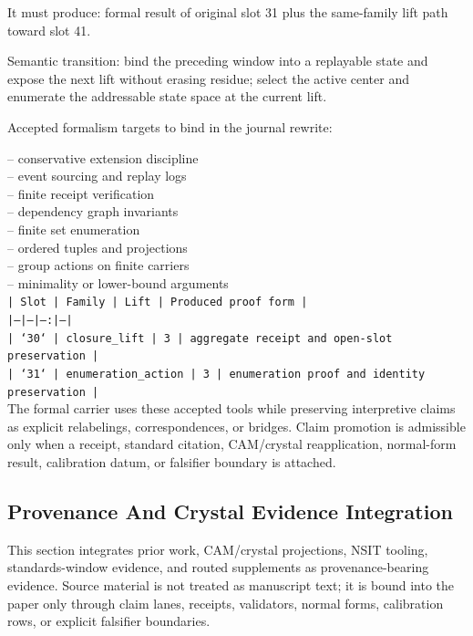 \documentclass[11pt]{article}
\begin{document}
It must produce: formal result of original slot 31 plus the same-family lift path toward slot 41.

Semantic transition: bind the preceding window into a replayable state and expose the next lift without erasing residue; select the active center and enumerate the addressable state space at the current lift.

Accepted formalism targets to bind in the journal rewrite:

\noindent{}-- conservative extension discipline\\
\noindent{}-- event sourcing and replay logs\\
\noindent{}-- finite receipt verification\\
\noindent{}-- dependency graph invariants\\
\noindent{}-- finite set enumeration\\
\noindent{}-- ordered tuples and projections\\
\noindent{}-- group actions on finite carriers\\
\noindent{}-- minimality or lower-bound arguments\\

\noindent\texttt{| Slot | Family | Lift | Produced proof form |}\\
\noindent\texttt{|---|---|---:|---|}\\
\noindent\texttt{| `30` | closure\_lift | 3 | aggregate receipt and open-slot preservation |}\\
\noindent\texttt{| `31` | enumeration\_action | 3 | enumeration proof and identity preservation |}\\

The formal carrier uses these accepted tools while preserving interpretive
claims as explicit relabelings, correspondences, or bridges. Claim promotion is admissible only when a receipt, standard citation,
CAM/crystal reapplication, normal-form result, calibration datum, or falsifier
boundary is attached.

\subsection*{Provenance And Crystal Evidence Integration}

This section integrates prior work, CAM/crystal projections, NSIT tooling,
standards-window evidence, and routed supplements as provenance-bearing
evidence. Source material is not treated as manuscript text; it is bound into
the paper only through claim lanes, receipts, validators, normal forms,
calibration rows, or explicit falsifier boundaries.
\end{document}
